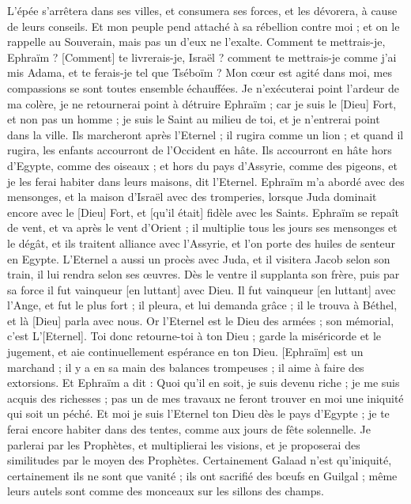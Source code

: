 \begin{multicols}{2}
L'épée s'arrêtera dans ses villes, et consumera ses forces, et les dévorera, à cause de leurs conseils.
Et mon peuple pend attaché à sa rébellion contre moi ; et on le rappelle au Souverain, mais pas un d'eux ne l'exalte.
Comment te mettrais-je, Ephraïm ? [Comment] te livrerais-je, Israël ? comment te mettrais-je comme j'ai mis Adama, et te ferais-je tel que Tséboïm ? Mon cœur est agité dans moi, mes compassions se sont toutes ensemble échauffées.
Je n'exécuterai point l'ardeur de ma colère, je ne retournerai point à détruire Ephraïm ; car je suis le [Dieu] Fort, et non pas un homme ; je suis le Saint au milieu de toi, et je n'entrerai point dans la ville.
Ils marcheront après l'Eternel ; il rugira comme un lion ; et quand il rugira, les enfants accourront de l'Occident en hâte.
Ils accourront en hâte hors d'Egypte, comme des oiseaux ; et hors du pays d'Assyrie, comme des pigeons, et je les ferai habiter dans leurs maisons, dit l'Eternel.
\VerseOne{}Ephraïm m'a abordé avec des mensonges, et la maison d'Israël avec des tromperies, lorsque Juda dominait encore avec le [Dieu] Fort, et [qu'il était] fidèle avec les Saints.
Ephraïm se repaît de vent, et va après le vent d'Orient ; il multiplie tous les jours ses mensonges et le dégât, et ils traitent alliance avec l'Assyrie, et l'on porte des huiles de senteur en Egypte.
L'Eternel a aussi un procès avec Juda, et il visitera Jacob selon son train, il lui rendra selon ses œuvres.
Dès le ventre il supplanta son frère, puis par sa force il fut vainqueur [en luttant] avec Dieu.
Il fut vainqueur [en luttant] avec l'Ange, et fut le plus fort ; il pleura, et lui demanda grâce ; il le trouva à Béthel, et là [Dieu] parla avec nous.
Or l'Eternel est le Dieu des armées ; son mémorial, c'est L'[Eternel].
Toi donc retourne-toi à ton Dieu ; garde la miséricorde et le jugement, et aie continuellement espérance en ton Dieu.
[Ephraïm] est un marchand ; il y a en sa main des balances trompeuses ; il aime à faire des extorsions.
Et Ephraïm a dit : Quoi qu'il en soit, je suis devenu riche ; je me suis acquis des richesses ; pas un de mes travaux ne feront trouver en moi une iniquité qui soit un péché.
Et moi je suis l'Eternel ton Dieu dès le pays d'Egypte ; je te ferai encore habiter dans des tentes, comme aux jours de fête solennelle.
Je parlerai par les Prophètes, et multiplierai les visions, et je proposerai des similitudes par le moyen des Prophètes.
Certainement Galaad n'est qu'iniquité, certainement ils ne sont que vanité ; ils ont sacrifié des bœufs en Guilgal ; même leurs autels sont comme des monceaux sur les sillons des champs.

\end{multicols}
